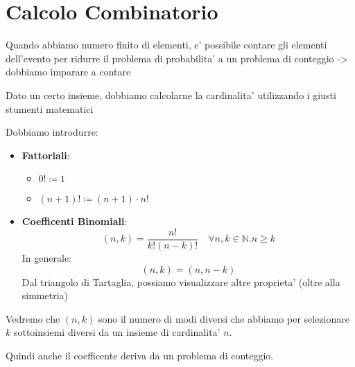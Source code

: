 % 
\chapter{Calcolo Combinatorio}  

Quando abbiamo numero finito di elementi, e' possibile contare gli elementi dell'evento per ridurre il problema di probabilita' a un problema di conteggio -> dobbiamo imparare a contare

Dato un certo insieme, dobbiamo calcolarne la cardinalita' utilizzando i giusti stumenti matematici


Dobbiamo introdurre:
\begin{itemize}
\item \textbf{Fattoriali}:
  \begin{itemize}
  \item $ 0! \coloneq 1 $
  \item $ (n+1)! \coloneq (n+1) \cdot n! $
  \end{itemize}
  \item \textbf{Coefficenti Binomiali}:
    \[
      (n,k) = \frac{n!}{k! (n-k)!} \quad \forall n,k\in \mathbb{N}. n \geq k
    \]
    In generale:
    \[
      (n,k) = (n,n-k)
    \]
    Dal triangolo di Tartaglia, possiamo visualizzare altre proprieta' (oltre alla simmetria)
\end{itemize}

Vedremo che $ (n,k) $ sono il numero di modi diversi che abbiamo per selezionare $ k $ sottoinsiemi diversi da un insieme di cardinalita' $ n $.


Quindi anche il coefficente deriva da un problema di conteggio.


